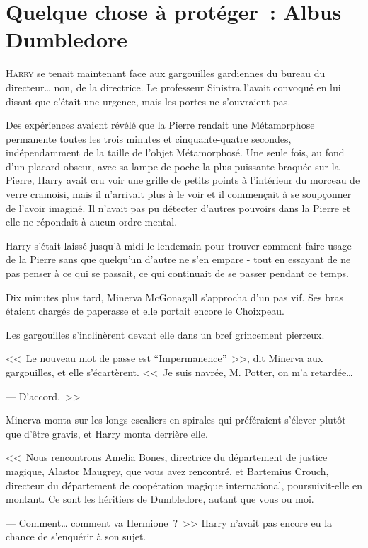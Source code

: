\chapter{Quelque chose à protéger~: Albus Dumbledore}

\lettrine{H}{arry} se tenait maintenant face aux gargouilles gardiennes du bureau du directeur… non, de la directrice. Le professeur Sinistra l'avait convoqué en lui disant que c'était une urgence, mais les portes ne s'ouvraient pas.

Des expériences avaient révélé que la Pierre rendait une Métamorphose permanente toutes les trois minutes et cinquante-quatre secondes, indépendamment de la taille de l'objet Métamorphosé. Une seule fois, au fond d'un placard obscur, avec sa lampe de poche la plus puissante braquée sur la Pierre, Harry avait cru voir une grille de petits points à l'intérieur du morceau de verre cramoisi, mais il n'arrivait plus à le voir et il commençait à se soupçonner de l'avoir imaginé. Il n'avait pas pu détecter d'autres pouvoirs dans la Pierre et elle ne répondait à aucun ordre mental.

Harry s'était laissé jusqu'à midi le lendemain pour trouver comment faire usage de la Pierre sans que quelqu'un d'autre ne s'en empare - tout en essayant de ne pas penser à ce qui se passait, ce qui continuait de se passer pendant ce temps.

Dix minutes plus tard, Minerva McGonagall s'approcha d'un pas vif. Ses bras étaient chargés de paperasse et elle portait encore le Choixpeau.

Les gargouilles s'inclinèrent devant elle dans un bref grincement pierreux.

<<~Le nouveau mot de passe est “Impermanence”~>>, dit Minerva aux gargouilles, et elle s'écartèrent. <<~Je suis navrée, M. Potter, on m'a retardée…

--- D'accord.~>>

Minerva monta sur les longs escaliers en spirales qui préféraient s'élever plutôt que d'être gravis, et Harry monta derrière elle.

<<~Nous rencontrons Amelia Bones, directrice du département de justice magique, Alastor Maugrey, que vous avez rencontré, et Bartemius Crouch, directeur du département de coopération magique international, poursuivit-elle en montant. Ce sont les héritiers de Dumbledore, autant que vous ou moi.

--- Comment… comment va Hermione~?~>> Harry n'avait pas encore eu la chance de s'enquérir à son sujet.

